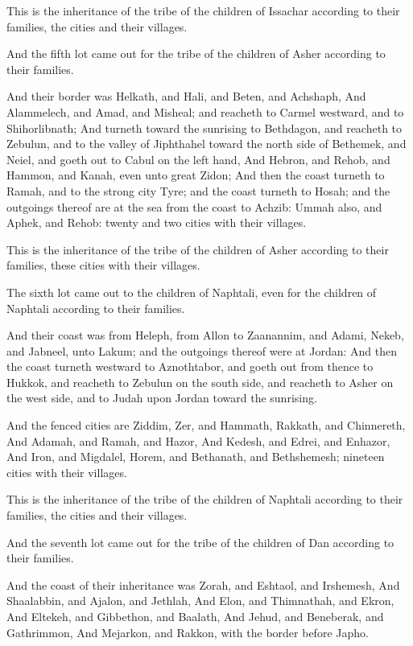 \Verse This is the inheritance of the tribe of the children of Issachar according to their families, the cities and their villages.

\Verse And the fifth lot came out for the tribe of the children of Asher according to their families.

\Verse And their border was Helkath, and Hali, and Beten, and Achshaph, \Verse And Alammelech, and Amad, and Misheal; and reacheth to Carmel westward, and to Shihorlibnath; \Verse And turneth toward the sunrising to Bethdagon, and reacheth to Zebulun, and to the valley of Jiphthahel toward the north side of Bethemek, and Neiel, and goeth out to Cabul on the left hand, \Verse And Hebron, and Rehob, and Hammon, and Kanah, even unto great Zidon; \Verse And then the coast turneth to Ramah, and to the strong city Tyre; and the coast turneth to Hosah; and the outgoings thereof are at the sea from the coast to Achzib: \Verse Ummah also, and Aphek, and Rehob: twenty and two cities with their villages.

\Verse This is the inheritance of the tribe of the children of Asher according to their families, these cities with their villages.

\Verse The sixth lot came out to the children of Naphtali, even for the children of Naphtali according to their families.

\Verse And their coast was from Heleph, from Allon to Zaanannim, and Adami, Nekeb, and Jabneel, unto Lakum; and the outgoings thereof were at Jordan: \Verse And then the coast turneth westward to Aznothtabor, and goeth out from thence to Hukkok, and reacheth to Zebulun on the south side, and reacheth to Asher on the west side, and to Judah upon Jordan toward the sunrising.

\Verse And the fenced cities are Ziddim, Zer, and Hammath, Rakkath, and Chinnereth, \Verse And Adamah, and Ramah, and Hazor, \Verse And Kedesh, and Edrei, and Enhazor, \Verse And Iron, and Migdalel, Horem, and Bethanath, and Bethshemesh; nineteen cities with their villages.

\Verse This is the inheritance of the tribe of the children of Naphtali according to their families, the cities and their villages.

\Verse And the seventh lot came out for the tribe of the children of Dan according to their families.

\Verse And the coast of their inheritance was Zorah, and Eshtaol, and Irshemesh, \Verse And Shaalabbin, and Ajalon, and Jethlah, \Verse And Elon, and Thimnathah, and Ekron, \Verse And Eltekeh, and Gibbethon, and Baalath, \Verse And Jehud, and Beneberak, and Gathrimmon, \Verse And Mejarkon, and Rakkon, with the border before Japho.

